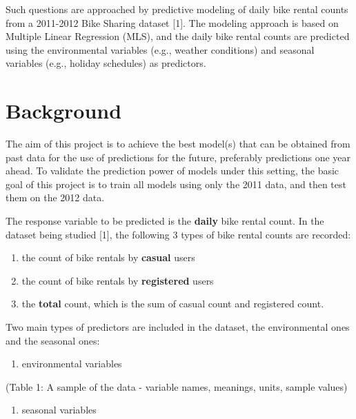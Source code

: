 \documentclass[
  twocolumn]{article}
\providecommand{\tightlist}{%
  \setlength{\itemsep}{0pt}\setlength{\parskip}{0pt}}
\begin{document}
Such questions are approached by predictive modeling of daily bike
rental counts from a 2011-2012 Bike Sharing dataset {[}1{]}. The
modeling approach is based on Multiple Linear Regression (MLS), and the
daily bike rental counts are predicted using the environmental variables
(e.g., weather conditions) and seasonal variables (e.g., holiday
schedules) as predictors.

\hypertarget{background}{%
\section{Background}\label{background}}

The aim of this project is to achieve the best model(s) that can be
obtained from past data for the use of predictions for the future,
preferably predictions one year ahead. To validate the prediction power
of models under this setting, the basic goal of this project is to train
all models using only the 2011 data, and then test them on the 2012
data.

The response variable to be predicted is the \textbf{daily} bike rental
count. In the dataset being studied {[}1{]}, the following 3 types of
bike rental counts are recorded:

\begin{enumerate}
\def\labelenumi{\arabic{enumi}.}
\tightlist
\item
  the count of bike rentals by \textbf{casual} users
\item
  the count of bike rentals by \textbf{registered} users
\item
  the \textbf{total} count, which is the sum of casual count and
  registered count.
\end{enumerate}

Two main types of predictors are included in the dataset, the
environmental ones and the seasonal ones:

\begin{enumerate}
\def\labelenumi{\arabic{enumi}.}
\tightlist
\item
  environmental variables
\end{enumerate}

(Table 1: A sample of the data - variable names, meanings, units, sample
values)

\begin{enumerate}
\def\labelenumi{\arabic{enumi}.}
\setcounter{enumi}{1}
\tightlist
\item
  seasonal variables
\end{enumerate}
\end{document}
